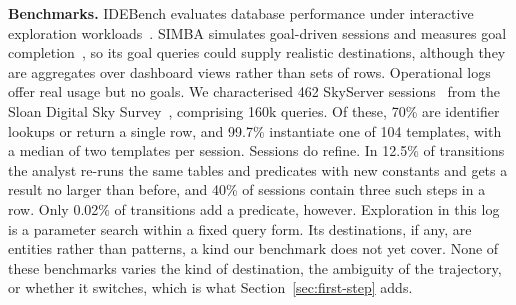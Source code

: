 \documentclass[sigconf]{acmart}
\begin{document}
\textbf{Benchmarks.}
IDEBench evaluates database performance under interactive exploration workloads~\cite{eichmannIDEBenchBenchmarkInteractive2020}. SIMBA simulates goal-driven sessions and measures goal completion~\cite{purichAdaptiveBenchmarkModeling2025}, so its goal queries could supply realistic destinations, although they are aggregates over dashboard views rather than sets of rows. Operational logs offer real usage but no goals. We characterised 462 SkyServer sessions~\cite{raddickTenYearsSkyserver2014} from the Sloan Digital Sky Survey~\cite{york_sloan_2000}, comprising 160k queries. Of these, 70\% are identifier lookups or return a single row, and 99.7\% instantiate one of 104 templates, with a median of two templates per session. Sessions do refine. In 12.5\% of transitions the analyst re-runs the same tables and predicates with new constants and gets a result no larger than before, and 40\% of sessions contain three such steps in a row. Only 0.02\% of transitions add a predicate, however. Exploration in this log is a parameter search within a fixed query form. Its destinations, if any, are entities rather than patterns, a kind our benchmark does not yet cover. None of these benchmarks varies the kind of destination, the ambiguity of the trajectory, or whether it switches, which is what Section~\ref{sec:first-step} adds.



\end{document}
